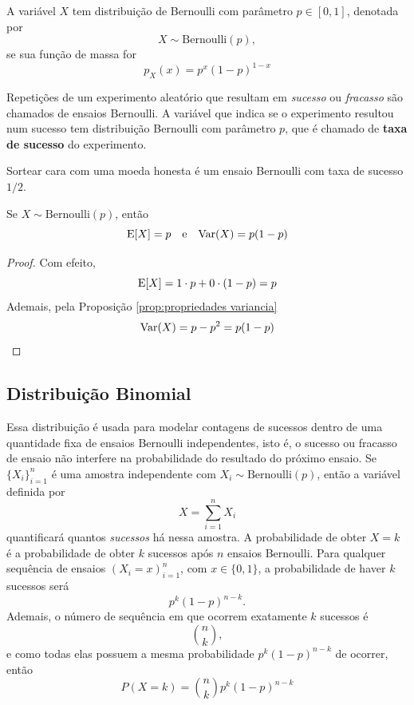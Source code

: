 \begin{def:bernoulli}
A variável $X$ tem distribuição de Bernoulli com parâmetro $p \in [0, 1]$, denotada por
\[
    X \sim \mathrm{Bernoulli}(p),
\]
se sua função de massa for
\[
    p_X(x) = p^x(1-p)^{1 - x}
\]
\end{def:bernoulli}

Repetições de um experimento aleatório que resultam em \textit{sucesso} ou \textit{fracasso}
são chamados de ensaios Bernoulli.
A variável que indica se o experimento resultou num sucesso tem distribuição Bernoulli
com parâmetro $p$, que é chamado de \textbf{taxa de sucesso} do experimento.

\begin{exp:bernoulli 1}
Sortear cara com uma moeda honesta é um ensaio Bernoulli com taxa de sucesso $1/2$.
\end{exp:bernoulli 1}

\begin{prop:esperanca bernoulli}
Se $X \sim \mathrm{Bernoulli}(p)$, então
\[
    \mathrm{E}\!\left[X\right] = p \quad \text{e} \quad \mathrm{Var}\!\left(X\right) = p(1-p)
\]
\end{prop:esperanca bernoulli}
\begin{proof}
Com efeito,
\[
    \mathrm{E}\!\left[X\right] = 1 \cdot p + 0 \cdot (1-p) = p
\]
Ademais, pela Proposição \ref{prop:propriedades variancia}
\[
    \mathrm{Var}\!\left(X\right) = p - p^2 = p(1-p)
\]

\end{proof}

\subsection{Distribuição Binomial}

Essa distribuição é usada para modelar contagens de sucessos dentro de uma quantidade
fixa de ensaios Bernoulli independentes, isto é, o sucesso ou fracasso de ensaio não
interfere na probabilidade do resultado do próximo ensaio.
Se $\{X_i\}_{i=1}^n$ é uma amostra independente com $X_i \sim \mathrm{Bernoulli}(p)$,
então a variável definida por
\[
    X = \sum_{i=1}^n X_i
\]
quantificará quantos \textit{sucessos} há nessa amostra.
A probabilidade de obter $X = k$ é a probabilidade de obter $k$ sucessos após $n$
ensaios Bernoulli.
Para qualquer sequência de ensaios $(X_i = x)_{i=1}^n$, com $x \in \{0, 1\}$,
a probabilidade de haver $k$ sucessos será
\[
    p^k(1-p)^{n-k}.
\]
Ademais, o número de sequência em que ocorrem exatamente $k$ sucessos é
\[
    \binom{n}{k},
\]
e como todas elas possuem a mesma probabilidade $p^k(1-p)^{n-k}$ de ocorrer, então
\[
    P(X = k) = \binom{n}{k} p^k(1-p)^{n-k}
\]

